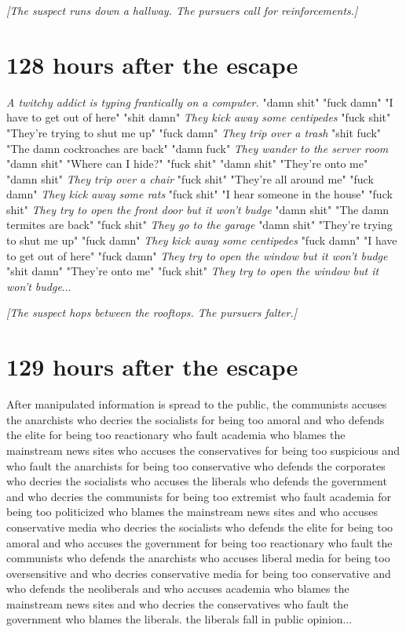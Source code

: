 \documentclass{report}
\begin{document}
\textit{[The suspect runs down a hallway. The pursuers call for reinforcements.]}


\section*{128 \small{hours after the escape}}

\textit{A twitchy addict is typing frantically on a computer.} "damn shit" \textit{} "fuck damn" "I have to get out of here" "shit damn" \textit{They kick away some centipedes} "fuck shit" "They're trying to shut me up" "fuck damn" \textit{They trip over a trash} "shit fuck" "The damn cockroaches are back" "damn fuck" \textit{They wander to the server room} "damn shit" "Where can I hide?" "fuck shit" \textit{} "damn shit" "They're onto me" "damn shit" \textit{They trip over a chair} "fuck shit" "They're all around me" "fuck damn" \textit{They kick away some rats} "fuck shit" "I hear someone in the house" "fuck shit" \textit{They try to open the front door but it won't budge} "damn shit" "The damn termites are back" "fuck shit" \textit{They go to the garage} "damn shit" "They're trying to shut me up" "fuck damn" \textit{They kick away some centipedes} "fuck damn" "I have to get out of here" "fuck damn" \textit{They try to open the window but it won't budge} "shit damn" "They're onto me" "fuck shit" \textit{} \textit{They try to open the window but it won't budge}...

\textit{[The suspect hops between the rooftops. The pursuers falter.]}


\section*{129 \small{hours after the escape}}

After manipulated information is spread to the public, the communists accuses the anarchists who decries the socialists for being too amoral and who defends the elite for being too reactionary who fault academia who blames the mainstream news sites who accuses the conservatives for being too suspicious and who fault the anarchists for being too conservative who defends the corporates who decries the socialists who accuses the liberals who defends the government and who decries the communists for being too extremist who fault academia for being too politicized who blames the mainstream news sites and who accuses conservative media who decries the socialists who defends the elite for being too amoral and who accuses the government for being too reactionary who fault the communists who defends the anarchists who accuses liberal media for being too oversensitive and who decries conservative media for being too conservative and who defends the neoliberals and who accuses academia who blames the mainstream news sites and who decries the conservatives who fault the government who blames the liberals. the liberals fall in public opinion...
\end{document}
